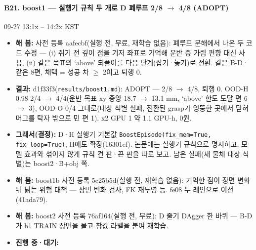 \paragraph{B21. boost1 --- 실행기 규칙 두 개로 D 폐루프 2/8 $\rightarrow$ 4/8 (ADOPT)}
{\small 09-27 13:1x -- 14:2x KST}
\begin{itemize}
  \item \textbf{해 봄:} 사전 등록 aafecbf(실행 전, 무료, 재학습 없음): 폐루프 분해에서 나온 두 코드 수정 --- (i) 쥐기 전 깊이 점을 기저 좌표로 기억해 운반 중 가림 편향 대신 사용, (ii) 같은 목표의 `above' 되풀이를 다음 단계(잡기·놓기)로 전환. 같은 B-D·같은 8편, 채택 = 성공 차 $\geq$ 2이고 퇴행 0.
  \item \textbf{결과:} d1f33f3(\texttt{results/\allowbreak{}boost1.\allowbreak{}md}): ADOPT --- 2/8 $\rightarrow$ 4/8, 퇴행 0. OOD-H 0.98 2/4 $\rightarrow$ 4/4(운반 목표 xy 중앙 18.7 $\rightarrow$ 13.1 mm, `above' 한도 도달 편 6 $\rightarrow$ 3), OOD-O 0/4 그대로(대상 식별 실패, 전환된 grasp가 엉뚱한 곳에서 닫혀 머그를 탁자 밖으로 민 편 1). x2 GPU 1 약 1.1 GPU-h, 0원.
  \item \textbf{그래서(결정):} D·H 실행기 기본값 \texttt{BoostEpisode(fix\_\allowbreak{}mem=True, fix\_\allowbreak{}loop=True)}, H에도 확장(16301ef). 논문에는 실행기 규칙으로 명시하고, 모델 효과와 섞이지 않게 규칙 켠 판·끈 판을 따로 보고. 남은 실패(새 물체 대상 식별)는 boost2·B+obj 쪽.
  \item \textbf{해 봄:} boost1b 사전 등록 5c25b5d(실행 전, 재학습 없음): 기억한 점이 장면 변화 뒤 낡는 위험 대책 --- 장면 변화 검사, FK 재투영 등. fe08 두 레인으로 이전(41ada79).
  \item \textbf{해 봄:} boost2 사전 등록 76af164(실행 전, 무료): D 줄기 DAgger 한 바퀴 --- B-D가 b1 TRAIN 장면을 몰고 참값 라벨을 붙여 재학습.
  \item \textbf{진행 중·대기:} 
\end{itemize}

